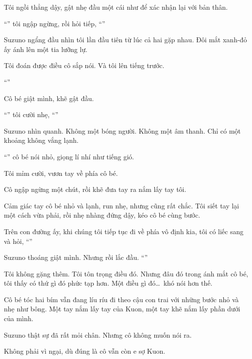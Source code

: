 \documentclass[../main.tex]{subfiles}
\begin{document}
Tôi ngồi thẳng dậy, gật nhẹ đầu một cái như để xác nhận lại với bản thân.

``'' tôi ngập ngừng, rồi hỏi tiếp, ``''

Suzuno ngẩng đầu nhìn tôi lần đầu tiên từ lúc cả hai gặp nhau. Đôi mắt xanh-đỏ ấy ánh lên một tia lưỡng lự.

Tôi đoán được điều cô sắp nói. Và tôi lên tiếng trước.

``''

Cô bé giật mình, khẽ gật đầu.

``'' tôi cười nhẹ, ``''

Suzuno nhìn quanh. Không một bóng người. Không một âm thanh. Chỉ có một khoảng không vắng lạnh.

``'' cô bé nói nhỏ, giọng lí nhí như tiếng gió.

Tôi mỉm cười, vươn tay về phía cô bé.

Cô ngập ngừng một chút, rồi khẽ đưa tay ra nắm lấy tay tôi.

Cảm giác tay cô bé nhỏ và lạnh, run nhẹ, nhưng cũng rất chắc. Tôi siết tay lại một cách vừa phải, rồi nhẹ nhàng đứng dậy, kéo cô bé cùng bước.

\ct

Trên con đường ấy, khi chúng tôi tiếp tục đi về phía vô định kia, tôi có liếc sang và hỏi, ``''

Suzuno thoáng giật mình. Nhưng rồi lắc đầu. ``''

Tôi không gặng thêm. Tôi tôn trọng điều đó. Nhưng đâu đó trong ánh mắt cô bé, tôi thấy có thứ gì đó phức tạp hơn. Một điều gì đó\dots\ khó nói hơn thế.

\pov{-}

Cô bé tóc hai bím vẫn đang líu ríu đi theo cậu con trai với những bước nhỏ và nhẹ như bông. Một tay nắm lấy tay của Kuon, một tay khẽ nắm lấy phần dưới của mình.

Suzuno thật sự đã rất mỏi chân. Nhưng cô không muốn nói ra.

Không phải vì ngại, dù đúng là cô vẫn còn e sợ Kuon.
\end{document}
